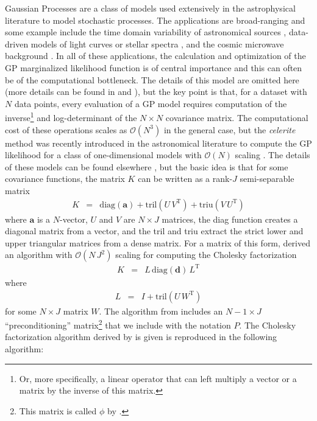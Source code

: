 \documentclass[rnaas]{aastex62}
\newcommand{\eqlabel}[1]{\label{eq:#1}}
\newcommand{\T}{\ensuremath{\mathrm{T}}}
\newcommand{\bvec}[1]{{\ensuremath{\boldsymbol{#1}}}}
\begin{document}
Gaussian Processes \citep[GPs][]{Rasmussen:2006} are a class of models used
extensively in the astrophysical literature to model stochastic processes.
The applications are broad-ranging and some example include the time domain
variability of astronomical sources \citep{Brewer:2009, Kelly:2014,
Haywood:2014, Rajpaul:2015, Foreman-Mackey:2017}, data-driven models of light
curves or stellar spectra \citep{Wang:2012, Luger:2016, Czekala:2017}, and the
cosmic microwave background \citep{Bond:1987,Wandelt:2003}.
In all of these applications, the calculation and optimization of the GP
marginalized likelihood function is of central importance and this can often
be of the computational bottleneck.
The details of this model are omitted here (more details can be found in
\citealt{Rasmussen:2006} and \citealt{Foreman-Mackey:2017}), but the key point
is that, for a dataset with $N$ data points, every evaluation of a GP model
requires computation of the inverse\footnote{Or, more specifically, a linear
operator that can left multiply a vector or a matrix by the inverse of this
matrix.} and log-determinant of the $N \times N$ covariance matrix.
The computational cost of these operations scales as $\mathcal{O}(N^3)$ in the
general case, but the \emph{celerite} method was recently introduced in the
astronomical literature to compute the GP likelihood for a class of
one-dimensional models with $\mathcal{O}(N)$ scaling
\citep{Foreman-Mackey:2017}.
The details of these models can be found elsewhere
\citep{Foreman-Mackey:2017}, but the basic idea is that for some covariance
functions, the matrix $K$ can be written as a rank-$J$ semi-separable matrix
\begin{eqnarray}\eqlabel{semi-K}
K &=& \mathrm{diag}(\bvec{a}) + \mathrm{tril}(U\,V^\T) +
    \mathrm{triu}(V\,U^\T)
\end{eqnarray}
where $\bvec{a}$ is a $N$-vector, $U$ and $V$ are $N \times J$ matrices, the
diag function creates a diagonal matrix from a vector, and the tril and triu
extract the strict lower and upper triangular matrices from a dense matrix.
For a matrix of this form, \citet{Foreman-Mackey:2017} derived an algorithm
with $\mathcal{O}(N\,J^2)$ scaling for computing the Cholesky factorization
\begin{eqnarray}
K &=& L\,\mathrm{diag}(\bvec{d})\,L^\T
\end{eqnarray}
where
\begin{eqnarray}\eqlabel{semi-L}
L &=& I + \mathrm{tril}(U\,W^\T)
\end{eqnarray}
for some $N \times J$ matrix $W$.
The algorithm from \citet{Foreman-Mackey:2017} includes an $N-1 \times J$
``preconditioning'' matrix\footnote{This matrix is called $\phi$ by
\citet{Foreman-Mackey:2017}.} that we include with the notation $P$.
The Cholesky factorization algorithm derived by \citet{Foreman-Mackey:2017} is
given is reproduced in the following algorithm:
\end{document}
